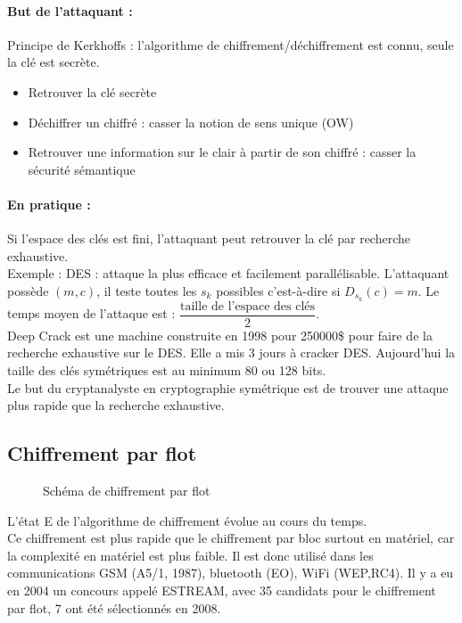\documentclass[12pt,a4paper]{report}
\begin{document}
\paragraph{But de l'attaquant :\\}
Principe de Kerkhoffs : l'algorithme de chiffrement/déchiffrement est connu, seule la clé est secrète.
\begin{itemize}
\item Retrouver la clé secrète 
\item Déchiffrer un chiffré : casser la notion de sens unique (OW)
\item Retrouver une information sur le clair à partir de son chiffré : casser la sécurité sémantique
\end{itemize}

\paragraph{En pratique :\\}
Si l'espace des clés est fini, l'attaquant peut retrouver la clé par recherche exhaustive.\\
Exemple : DES : attaque la plus efficace et facilement parallélisable. L'attaquant possède $(m,c)$, il teste toutes les $s_k$ possibles c'est-à-dire si $D_{s_k}(c)=m$. Le temps moyen de l'attaque est : $\dfrac{\mbox{taille de l'espace des clés}}{2} $.\\
Deep Crack est une machine construite en 1998 pour 250000\$ pour faire de la recherche exhaustive sur le DES. Elle a mis 3 jours à cracker DES. Aujourd'hui la taille des clés symétriques est au minimum 80 ou 128 bits.\\
Le but du cryptanalyste en cryptographie symétrique est de trouver une attaque plus rapide que la recherche exhaustive.

\subsection{Chiffrement par flot}

\begin{figure}[h]
	\centering
  \scalebox{0.8}{}	
  \caption{Schéma de chiffrement par flot}
\end{figure}
L'état E de l'algorithme de chiffrement évolue au cours du temps.\\
Ce chiffrement est plus rapide que le chiffrement par bloc surtout en matériel, car la complexité en matériel est plus faible. Il est donc utilisé dans les communications GSM (A5/1, 1987), bluetooth (EO), WiFi (WEP,RC4).
Il y a eu en 2004 un concours appelé ESTREAM, avec 35 candidats pour le chiffrement par flot, 7 ont été sélectionnés en 2008.
\end{document}
